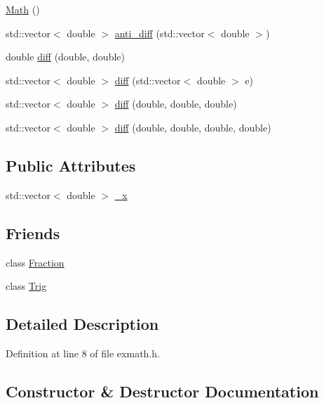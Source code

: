 \begin{DoxyCompactItemize}
\item 
\hyperlink{class_math_a4b0f0a2da150d3fbfdb71524420c9fbf}{Math} ()
\item 
std\+::vector$<$ double $>$ \hyperlink{class_math_adacb39157676f1d1cee16c20c35172f9}{anti\+\_\+diff} (std\+::vector$<$ double $>$)
\item 
double \hyperlink{class_math_adc2300b635961bd2c1aa5547af225ee5}{diff} (double, double)
\item 
std\+::vector$<$ double $>$ \hyperlink{class_math_a7b3e0272a2b60301ea093a21ad9cf104}{diff} (std\+::vector$<$ double $>$ e)
\item 
std\+::vector$<$ double $>$ \hyperlink{class_math_a2fb6670bbe0f85e66058b033109554d9}{diff} (double, double, double)
\item 
std\+::vector$<$ double $>$ \hyperlink{class_math_afc27f43ddba68c2aa1fb39a3c63efa0c}{diff} (double, double, double, double)
\end{DoxyCompactItemize}
\subsection*{Public Attributes}
\begin{DoxyCompactItemize}
\item 
std\+::vector$<$ double $>$ \hyperlink{class_math_a414ad22921de6ac30c3002770c6cadf2}{\+\_\+x}
\end{DoxyCompactItemize}
\subsection*{Friends}
\begin{DoxyCompactItemize}
\item 
class \hyperlink{class_math_ac61a95a43ace8521281eb9a7f4c14b88}{Fraction}
\item 
class \hyperlink{class_math_a4736ea1f14879a304bb656865c08e97e}{Trig}
\end{DoxyCompactItemize}


\subsection{Detailed Description}


Definition at line 8 of file exmath.\+h.



\subsection{Constructor \& Destructor Documentation}
